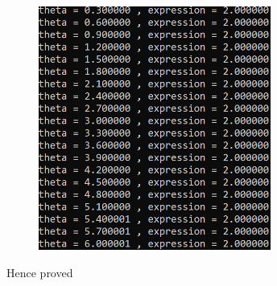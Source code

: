 \documentclass[a4paper,12pts]{article}
\begin{document}
\\[.03in]
\begin{figure}[H]
\begin{center}
\includegraphics[width=3in]{fig.png}
\end{center}
\end{figure}
Hence proved
\end{document}
